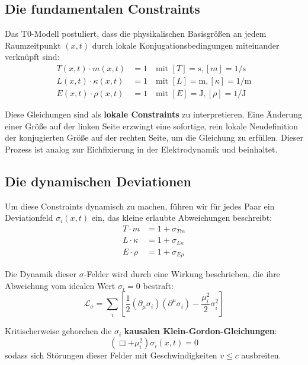 	\subsection{Die fundamentalen Constraints}
	Das T0-Modell postuliert, dass die physikalischen Basisgrößen an jedem Raumzeitpunkt $(x,t)$ durch lokale Konjugationsbedingungen miteinander verknüpft sind:
	\begin{align}
		T(x,t) \cdot m(x,t) &= 1 \quad \text{mit } [T] = \text{s}, [m] = 1/\text{s} \label{eq:conj1} \\
		L(x,t) \cdot \kappa(x,t) &= 1 \quad \text{mit } [L] = \text{m}, [\kappa] = 1/\text{m} \label{eq:conj2} \\
		E(x,t) \cdot \rho(x,t) &= 1 \quad \text{mit } [E] = \text{J}, [\rho] = 1/\text{J} \label{eq:conj3}
	\end{align}
	
	Diese Gleichungen sind als \textbf{lokale Constraints} zu interpretieren. Eine Änderung einer Größe auf der linken Seite erzwingt eine sofortige, rein lokale Neudefinition der konjugierten Größe auf der rechten Seite, um die Gleichung zu erfüllen. Dieser Prozess ist analog zur Eichfixierung in der Elektrodynamik und beinhaltet.
	
	\subsection{Die dynamischen Deviationen}
	Um diese Constraints dynamisch zu machen, führen wir für jedes Paar ein Deviationfeld $\sigma_i(x,t)$ ein, das kleine erlaubte Abweichungen beschreibt:
	\begin{align}
		T \cdot m &= 1 + \sigma_{Tm} \label{eq:sigma_tm} \\
		L \cdot \kappa &= 1 + \sigma_{L\kappa} \label{eq:sigma_lk} \\
		E \cdot \rho &= 1 + \sigma_{E\rho} \label{eq:sigma_er}
	\end{align}
	
	Die Dynamik dieser $\sigma$-Felder wird durch eine Wirkung beschrieben, die ihre Abweichung vom idealen Wert $\sigma_i = 0$ bestraft:
	\begin{equation}
		\mathcal{L}_{\sigma} = \sum_i \left[ \frac{1}{2} (\partial_\mu \sigma_i)(\partial^\mu \sigma_i) - \frac{\mu_i^2}{2} \sigma_i^2 \right] \label{eq:L_sigma}
	\end{equation}
	
	Kritischerweise gehorchen die $\sigma_i$ \textbf{kausalen Klein-Gordon-Gleichungen}:
	\begin{equation}
		(\Box + \mu_i^2) \sigma_i(x,t) = 0 \label{eq:kg}
	\end{equation}
	sodass sich Störungen dieser Felder mit Geschwindigkeiten $v \leq c$ ausbreiten.
	
